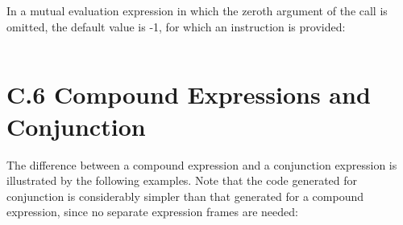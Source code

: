 In a mutual evaluation expression in which the zeroth argument of the
{\textquotedbl}call{\textquotedbl} is omitted, the default value is
-1, for which an instruction is provided:

\begin{center}
\tabletail{}
\tablelasttail{}
\begin{supertabular}{|m{1.9073598in}|m{2.75596in}|}

\end{supertabular}
\end{center}


\section[C.6 Compound Expressions and Conjunction]{C.6 Compound Expressions and Conjunction}

The difference between a compound expression and a conjunction
expression is illustrated by the following examples. Note that the
code generated for conjunction is considerably simpler than that
generated for a compound expression, since no separate expression
frames are needed:

